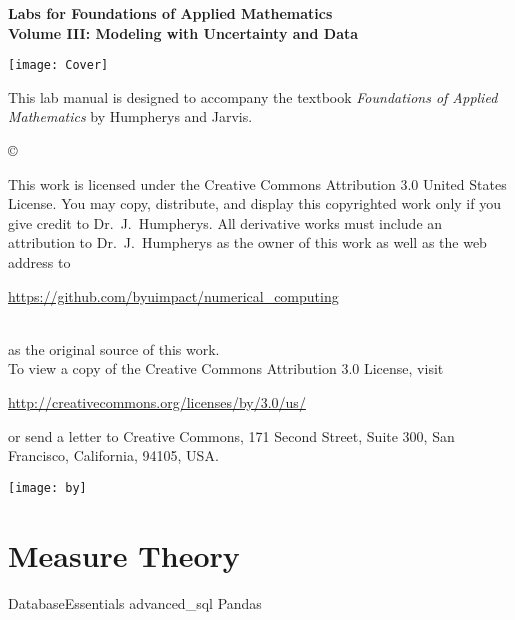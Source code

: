 \documentclass[nociteref]{SIAM-GH-book}
\begin{document}
\thispagestyle{empty}
\begin{center}
{\huge \bf Labs for Foundations of Applied Mathematics} \\
\vspace{5mm}
{\Large \bf Volume III: Modeling with
Uncertainty and Data}
\vspace{20mm}

\texttt{[image: Cover]}
\end{center}
\frontmatter




\begin{thepreface}
This lab manual is designed to accompany the textbook \emph{Foundations of Applied Mathematics} by Humpherys and Jarvis.

\vfill
\copyright{This work is licensed under the Creative Commons Attribution 3.0 United States
License.  You may copy, distribute, and display this copyrighted work only if you give
credit to Dr.~J.~Humpherys. All derivative works must include an attribution to Dr.~J.~Humpherys as the owner of this work as well as the web address to
\\\centerline{\url{https://github.com/byuimpact/numerical_computing}}\\ as the original source of
this
work.\\To view a copy of the Creative Commons Attribution 3.0 License,
visit\\\centerline{\url{http://creativecommons.org/licenses/by/3.0/us/}} or send a letter to
Creative Commons, 171 Second Street, Suite 300, San Francisco, California, 94105, USA.}

\vfill
\centering\texttt{[image: by]}
\vfill
\end{thepreface}

\setcounter{tocdepth}{1}
\tableofcontents

\mainmatter

\part{Measure Theory}
{DatabaseEssentials}
{advanced_sql}
{Pandas}
\end{document}
